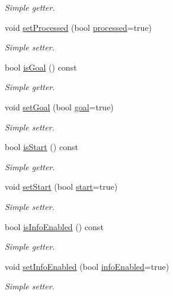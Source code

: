 \begin{DoxyCompactItemize}
\begin{DoxyCompactList}\small\item\em Simple getter. \end{DoxyCompactList}\item 
void \hyperlink{classGridCell_a72581a1a587bebaba02fb36d419d3768}{set\+Processed} (bool \hyperlink{classGridCell_acd279e15b141714d74586ba0a05e9d7b}{processed}=true)
\begin{DoxyCompactList}\small\item\em Simple setter. \end{DoxyCompactList}\item 
bool \hyperlink{classGridCell_a556d638eef4f4135158dcdcff87f761a}{is\+Goal} () const 
\begin{DoxyCompactList}\small\item\em Simple getter. \end{DoxyCompactList}\item 
void \hyperlink{classGridCell_aa9092a59955a34313dea633eab05d4c8}{set\+Goal} (bool \hyperlink{classGridCell_afe1b6d3afa06397f1732c07cfd9111ed}{goal}=true)
\begin{DoxyCompactList}\small\item\em Simple setter. \end{DoxyCompactList}\item 
bool \hyperlink{classGridCell_a233cabce55d024827a351a91292f3b19}{is\+Start} () const 
\begin{DoxyCompactList}\small\item\em Simple getter. \end{DoxyCompactList}\item 
void \hyperlink{classGridCell_ad104aba9157bb24a30a6e802950ffd37}{set\+Start} (bool \hyperlink{classGridCell_ac9fb7e6a84df215d9a3888428fe63425}{start}=true)
\begin{DoxyCompactList}\small\item\em Simple setter. \end{DoxyCompactList}\item 
bool \hyperlink{classGridCell_a1adf0636dabff7aca3d815ac7f888607}{is\+Info\+Enabled} () const 
\begin{DoxyCompactList}\small\item\em Simple getter. \end{DoxyCompactList}\item 
void \hyperlink{classGridCell_ab6312c017289556a74736f4dcf3d0062}{set\+Info\+Enabled} (bool \hyperlink{classGridCell_a2dbb35023dd7a201c1c02569204cfd2e}{info\+Enabled}=true)
\begin{DoxyCompactList}\small\item\em Simple setter. \end{DoxyCompactList}\end{DoxyCompactItemize}
